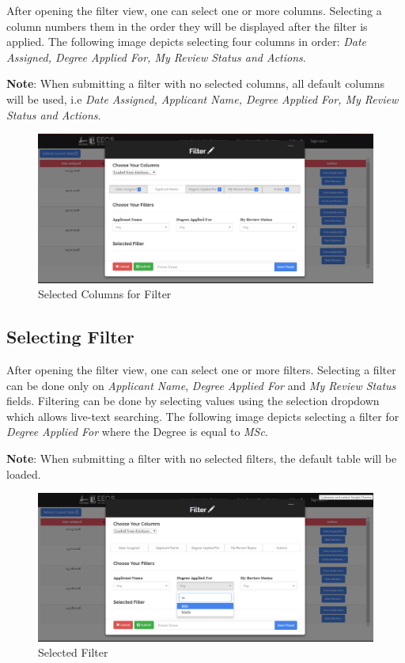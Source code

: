 \documentclass[fontsize=12pt,paper=letter,twoside]{scrartcl}
\begin{document}
After opening the filter view, one can select one or more columns. Selecting a column numbers them in the order they will be displayed after the filter is applied. The following image depicts selecting four columns in order: \emph{Date Assigned, Degree Applied For, My Review Status and Actions}.

\bigskip
\noindent \textbf{Note}: When submitting a filter with no selected columns, all default columns will be used, i.e \emph{Date Assigned, Applicant Name, Degree Applied For, My Review Status and Actions}.

\begin{figure}[!htb]
\begin{center}
\includegraphics[width=.9\textwidth]{images/selected_col.png}
\end{center}
\caption{Selected Columns for Filter}
\label{fig:fm_selected_col}
\end{figure}

\subsection{Selecting Filter}

After opening the filter view, one can select one or more filters. Selecting a filter can be done only on \emph{Applicant Name}, \emph{Degree Applied For} and \emph{My Review Status} fields. Filtering can be done by selecting values using the selection dropdown which allows live-text searching. The following image depicts selecting a filter for \emph{Degree Applied For} where the Degree is equal to \emph{MSc}.

\bigskip
\noindent \textbf{Note}: When submitting a filter with no selected filters, the default table will be loaded.

\clearpage
\begin{figure}[!htb]
\begin{center}
\includegraphics[width=.9\textwidth]{images/selected_filter.png}
\end{center}
\caption{Selected Filter}
\label{fig:fm_selected_filter}
\end{figure}
\end{document}
